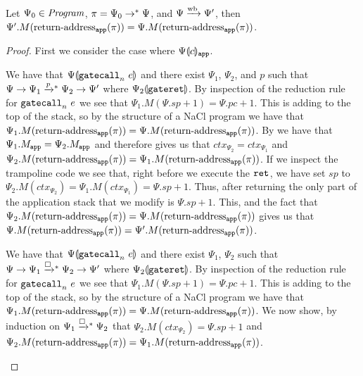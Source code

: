 \begin{lemma} \label{lemma:appendix:nacl:return-address-integrity}
  Let $\Psi_0 \in \mathit{Program}$, $\pi = \Psi_0 \mathrel{\mathrel{\rightarrow}^{\ast}} \Psi$, and $\Psi \mathrel{\xrightarrow{\!\text{wb}}} \Psi'$, then $\Psi'.M(\operatorname{return-address}_{\mathtt{app}}(\pi)) = \Psi.M(\operatorname{return-address}_{\mathtt{app}}(\pi))$.
\end{lemma}
\begin{proof}
  First we consider the case where ${\Psi}\llparenthesis{c}\rrparenthesis_{\mathtt{app}}$.
  \begin{itemize}

    \sloppy
    We have that ${\Psi}\llparenthesis{\ensuremath{\mathtt{gatecall}_{n}\ {e}}}\rrparenthesis$ and there exist $\Psi_1$, $\Psi_2$, and $p$ such that $\Psi \step \Psi_1 \steppstar{p} \Psi_2 \step \Psi'$ where ${\Psi_2}\llparenthesis{\ensuremath{\mathtt{gateret}}}\rrparenthesis$.
    By inspection of the reduction rule for $\mathtt{gatecall}_{n}\ {e}$ we see that $\Psi_1.M(\Psi.sp + 1) = \Psi.pc + 1$.
    This is adding to the top of the stack, so by the structure of a NaCl program we have that $\Psi_1.M(\operatorname{return-address}_{\mathtt{app}}(\pi)) = \Psi.M(\operatorname{return-address}_{\mathtt{app}}(\pi))$.
    By  we have that $\Psi_1.M_{\mathtt{app}} = \Psi_2.M_{\mathtt{app}}$ and therefore  gives us that $ctx_{\Psi_2} = ctx_{\Psi_1}$ and $\Psi_2.M(\operatorname{return-address}_{\mathtt{app}}(\pi)) = \Psi_1.M(\operatorname{return-address}_{\mathtt{app}}(\pi))$.
    If we inspect the trampoline code we see that, right before we execute the $\mathtt{ret}_{{}}$, we have set $sp$ to $\Psi_2.M(ctx_{\Psi_2}) = \Psi_1.M(ctx_{\Psi_1}) = \Psi.sp + 1$.
    Thus, after returning the only part of the application stack that we modify is $\Psi.sp + 1$.
    This, and the fact that $\Psi_2.M(\operatorname{return-address}_{\mathtt{app}}(\pi)) = \Psi.M(\operatorname{return-address}_{\mathtt{app}}(\pi))$ gives us that $\Psi.M(\operatorname{return-address}_{\mathtt{app}}(\pi)) = \Psi'.M(\operatorname{return-address}_{\mathtt{app}}(\pi))$.


    We have that ${\Psi}\llparenthesis{\ensuremath{\mathtt{gatecall}_{n}\ {e}}}\rrparenthesis$ and there exist $\Psi_1$, $\Psi_2$  such that $\Psi \step \Psi_1 \stepboxstar \Psi_2 \step \Psi'$ where ${\Psi_2}\llparenthesis{\ensuremath{\mathtt{gateret}}}\rrparenthesis$.
    By inspection of the reduction rule for $\mathtt{gatecall}_{n}\ {e}$ we see that $\Psi_1.M(\Psi.sp + 1) = \Psi.pc + 1$.
    This is adding to the top of the stack, so by the structure of a NaCl program we have that $\Psi_1.M(\operatorname{return-address}_{\mathtt{app}}(\pi)) = \Psi.M(\operatorname{return-address}_{\mathtt{app}}(\pi))$.
    We now show, by induction on $\Psi_1 \stepboxstar \Psi_2$ that $\Psi_2.M(ctx_{\Psi_2}) = \Psi.sp + 1$ and $\Psi_2.M(\operatorname{return-address}_{\mathtt{app}}(\pi)) = \Psi_1.M(\operatorname{return-address}_{\mathtt{app}}(\pi))$.


\end{itemize}
\end{proof}
